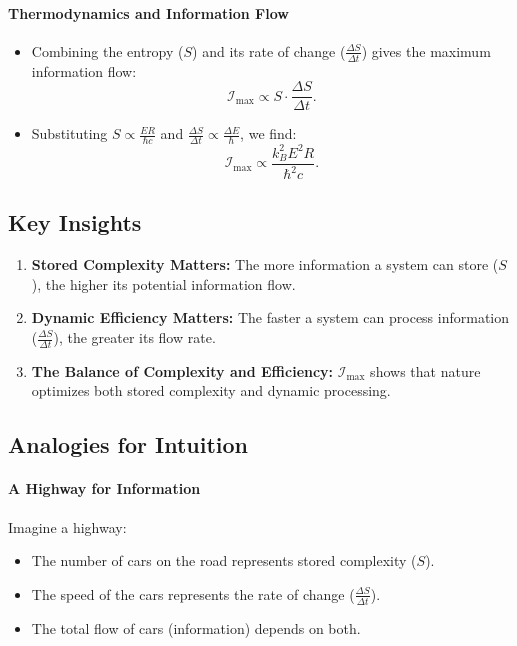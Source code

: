 \documentclass[12pt]{article}
\begin{document}
\paragraph{Thermodynamics and Information Flow}
\begin{itemize}
    \item Combining the entropy (\(S\)) and its rate of change (\(\frac{\Delta S}{\Delta t}\)) gives the maximum information flow:
    \[
    \mathcal{I}_{\text{max}} \propto S \cdot \frac{\Delta S}{\Delta t}.
    \]
    \item Substituting \(S \propto \frac{E R}{\hbar c}\) and \(\frac{\Delta S}{\Delta t} \propto \frac{\Delta E}{\hbar}\), we find:
    \[
    \mathcal{I}_{\text{max}} \propto \frac{k_B^2 E^2 R}{\hbar^2 c}.
    \]
\end{itemize}

\subsection{Key Insights}
\begin{enumerate}
    \item \textbf{Stored Complexity Matters:} The more information a system can store (\(S\)), the higher its potential information flow.
    \item \textbf{Dynamic Efficiency Matters:} The faster a system can process information (\(\frac{\Delta S}{\Delta t}\)), the greater its flow rate.
    \item \textbf{The Balance of Complexity and Efficiency:} \(\mathcal{I}_{\text{max}}\) shows that nature optimizes both stored complexity and dynamic processing.
\end{enumerate}

\subsection{Analogies for Intuition}
\paragraph{A Highway for Information}
Imagine a highway:
\begin{itemize}
    \item The number of cars on the road represents stored complexity (\(S\)).
    \item The speed of the cars represents the rate of change (\(\frac{\Delta S}{\Delta t}\)).
    \item The total flow of cars (information) depends on both.
\end{itemize}
\end{document}
